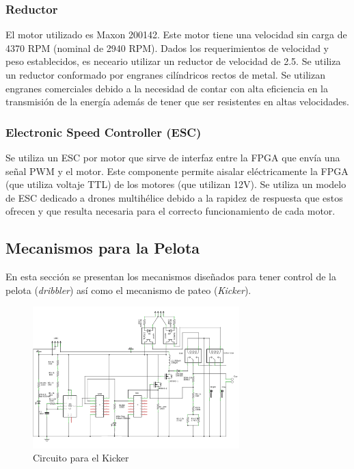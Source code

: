 \documentclass[twocolumn,10pt]{amrob}
\begin{document}
\subsubsection*{Reductor}
El motor utilizado es Maxon 200142. Este motor tiene una velocidad sin carga de 4370 RPM (nominal de 2940 RPM). Dados los requerimientos de velocidad y peso establecidos, es neceario utilizar un reductor de velocidad de 2.5. Se utiliza un reductor conformado por engranes cilíndricos rectos de metal. Se utilizan engranes comerciales debido a la necesidad de contar con alta eficiencia en la transmisión de la energía además de tener que ser resistentes en altas velocidades. \par
\subsubsection*{Electronic Speed Controller (ESC)}
Se utiliza un ESC por motor que sirve de interfaz entre la FPGA que envía una señal PWM y el motor. Este componente permite aisalar eléctricamente la FPGA (que utiliza voltaje TTL) de los motores (que utilizan 12V). Se utiliza un modelo de ESC dedicado a drones multihélice debido a la rapidez de respuesta que estos ofrecen y que resulta necesaria para el correcto funcionamiento de cada motor.\par 
\subsection*{Mecanismos para la Pelota}
En esta sección se presentan los mecanismos diseñados para tener control de la pelota (\textit{dribbler}) así como el mecanismo de pateo (\textit{Kicker}).
\begin{figure}
  \centering
    \includegraphics[width=8cm]{circuitoKicker.png}
  \caption{Circuito para el Kicker}
  \label{fig:elecKicker}
\end{figure}
\end{document}

